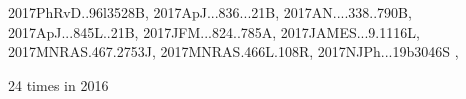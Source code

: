 \documentclass[12pt]{article}
\begin{document}
\begin{description}
{2017PhRvD..96l3528B,%
2017ApJ...836...21B,%
2017AN....338..790B,%
2017ApJ...845L..21B,%
2017JFM...824..785A,%
2017JAMES...9.1116L,%
2017MNRAS.467.2753J,%
2017MNRAS.466L.108R,%
2017NJPh...19b3046S%
},\item 24 times in 2016 \citep{
2016PhRvL.116j1101C,%
2016MNRAS.462.4402C,%
2016ApJ...833...43C,%
2016ApJ...832..150C,%
2016MNRAS.462..818B,%
2016arXiv160606725A,%
2016arXiv160209105O,%
2016arXiv160700980O,%
2016arXiv160703720K,%
2016MNRAS.461..240B,%
2016ApJS..224...39Y,%
2016A&A...593A.134C,%
2016PhyS...91j4008K,%
2016A&A...589A.125W,%
2016MNRAS.459.4046J,%
2016A&A...591A.133L,%
2016A&A...589A..86B,%
2016A&A...587A...4T,%
}
\end{description}
\end{document}

